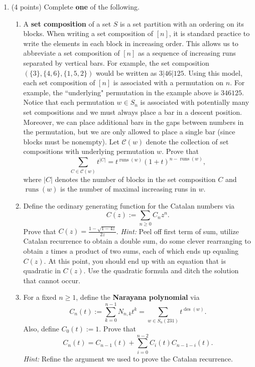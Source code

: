 \documentclass[11pt]{article}
\theoremstyle{definition}
\DeclareMathOperator{\des}{des}
\DeclareMathOperator{\runs}{runs}
\begin{document}
\begin{enumerate}

\item (4 points) Complete \textbf{one} of the following.
\begin{enumerate}
\item A \textbf{set composition} of a set $S$ is a set partition with an ordering on its blocks. When writing a set composition of $[n]$, it is standard practice to write the elements in each block in increasing order. This allows us to abbreviate a set composition of $[n]$ as a sequence of increasing runs separated by vertical bars. For example, the set composition $(\{3\},\{4,6\},\{1,5,2\})$ would be written as $3|46|125$. Using this model, each set composition of $[n]$ is associated with a permutation on $n$. For example, the ``underlying" permutation in the example above is $346125$. Notice that each permutation $w\in S_n$ is associated with potentially many set compositions and we must always place a bar in a descent position. Moreover, we can place additional bars in the gaps between numbers in the permutation, but we are only allowed to place a single bar (since blocks must be nonempty). Let $\mathcal{C}(w)$ denote the collection of set compositions with underlying permutation $w$. Prove that
\[
\sum_{C\in\mathcal{C}(w)}t^{|C|}=t^{\runs(w)}(1+t)^{n-\runs(w)},
\]
where $|C|$ denotes the number of blocks in the set composition $C$ and $\runs(w)$ is the number of maximal increasing runs in $w$.


\item Define the ordinary generating function for the Catalan numbers via
\[
C(z):=\sum_{n\geq 0}C_nz^n.
\]
Prove that $\displaystyle C(z)=\frac{1-\sqrt{1-4z}}{2z}$.  \emph{Hint:} Peel off first term of sum, utilize Catalan recurrence to obtain a double sum, do some clever rearranging to obtain $z$ times a product of two sums, each of which ends up equaling $C(z)$.  At this point, you should end up with an equation that is quadratic in $C(z)$.  Use the quadratic formula and ditch the solution that cannot occur.

\item For a fixed $n\geq 1$, define the \textbf{Narayana polynomial} via
\[
C_n(t):=\sum_{k=0}^{n-1}N_{n,k}t^k=\sum_{w\in S_n(231)}t^{\des(w)}.
\]
Also, define $C_0(t):=1$. Prove that
\[
C_n(t)=C_{n-1}(t)+\sum_{i=0}^{n-2}C_i(t)C_{n-1-i}(t).
\]
\emph{Hint:} Refine the argument we used to prove the Catalan recurrence.


\end{enumerate}
\end{enumerate}
\end{document}
